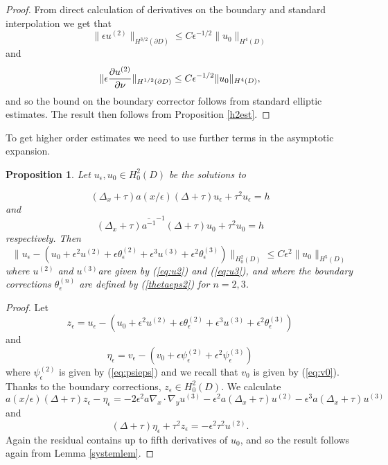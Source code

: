 \documentclass[10pt,a4paper]{amsart}
\newtheorem{proposition}{Proposition}
\begin{document}
\begin{proof} From direct calculation of derivatives on the boundary and standard interpolation we get that $$ \| \epsilon u^{(2)} \|_{H^{3/2}(\partial D)}\leq C\epsilon^{-1/2} \| u_0 \|_{H^4( D)}$$ and $$ \| \epsilon{ \partial u^{(2)}\over{\partial\nu}} \|_{H^{1/2}(\partial D)}\leq C\epsilon^{-1/2} \| u_0 \|_{H^4( D)},$$ and so the bound on the boundary corrector follows from standard elliptic estimates. The result then follows from Proposition \ref{h2est}.
\end{proof}
\noindent
To get higher order estimates we need to use further terms in the asymptotic expansion. 
\begin{proposition}\label{h2est2} Let $u_\epsilon, u_0 \in H^2_0( D)$  be the solutions to 

\begin{equation} \label{fourthordeqest-ae2}  (\Delta_x +\tau) a(x/\epsilon) (\Delta +\tau) u_\epsilon +\tau^2 u_\epsilon= h \end{equation}
and
\begin{equation} \label{homogeqest-ae2}  (\Delta_x +\tau) \overline{a^{-1}}^{-1} (\Delta +\tau) u_0 +\tau^2 u_0= h \end{equation}
respectively. Then 
$$ \| u_\epsilon -(u_0 +\epsilon^2 u^{(2)}  +\epsilon\theta_\epsilon^{(2)}+ \epsilon^3 u^{(3)}  +\epsilon^2\theta_\epsilon^{(3)} ) \|_{H_0^2( D)} \leq C\epsilon^2 \| u_0 \|_{H^5( D)} $$
where $u^{(2)}$ and $u^{(3)}$are given by (\ref{eq:u2}) and (\ref{eq:u3}), and where the boundary corrections $\theta^{(n)}_\epsilon$ are defined by (\ref{thetaeps2}) for $n=2,3$. 
\end{proposition} 
\begin{proof} Let 
$$ z_\epsilon =  u_\epsilon -(u_0 +\epsilon^2 u^{(2)}  +\epsilon \theta_\epsilon^{(2)} +\epsilon^3  u^{(3)}  +\epsilon^2\theta_\epsilon^{(3)}  ) $$
and $$ \eta_\epsilon = v_\epsilon -(v_0 + \epsilon  \psi_\epsilon^{(2)}+  \epsilon^2  \psi_\epsilon^{(3)} )$$
where $\psi_\epsilon^{(2)}$ is given by (\ref{eq:psieps}) and we recall that $v_0$ is given by (\ref{eq:v0}).  Thanks to the boundary corrections, $z_\epsilon\in H^2_0( D)$. We calculate 
\begin{equation} a(x/\epsilon) (\Delta +\tau )z_\epsilon - \eta_\epsilon  = -2\epsilon^2  a \nabla_x\cdot\nabla_y u^{(3)} - \epsilon^2 a(\Delta_x+\tau)u^{(2)}   -\epsilon^3 a(\Delta_x+\tau)u^{(3)}\end{equation}
and
\begin{equation} (\Delta +\tau )\eta_\epsilon  +\tau^2 z_\epsilon = -\epsilon^2 \tau^2 u^{(2)} .\end{equation}
Again the residual contains up to fifth derivatives of $u_0$, and so the result follows again from Lemma \ref{systemlem}. 
\end{proof}
\end{document}
